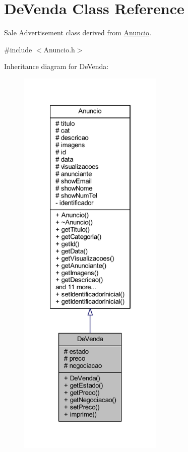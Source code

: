 \hypertarget{class_de_venda}{}\section{De\+Venda Class Reference}
\label{class_de_venda}


Sale Advertisement class derived from \hyperlink{class_anuncio}{Anuncio}.  




{\ttfamily \#include $<$Anuncio.\+h$>$}



Inheritance diagram for De\+Venda\+:\nopagebreak
\begin{figure}[H]
\begin{center}
\leavevmode
\includegraphics[height=550pt]{class_de_venda__inherit__graph}
\end{center}
\end{figure}


